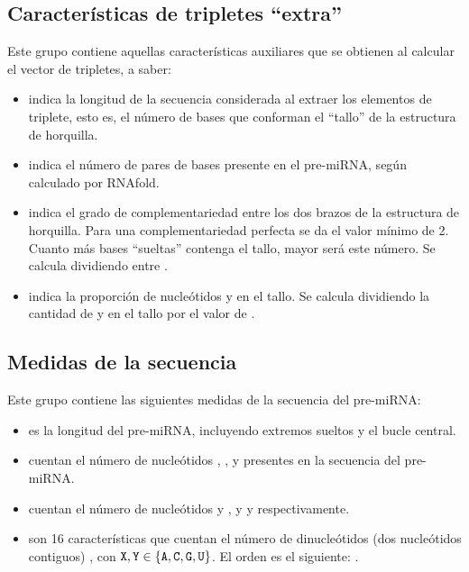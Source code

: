 \documentclass[12pt,bibliography=oldstyle,DIV=12,parskip=half-]{scrartcl}
\begin{document}
\subsection{Características de tripletes ``extra''}
Este grupo contiene aquellas características auxiliares que se obtienen
al calcular el vector de tripletes, a saber:
\begin{itemize}
\item{} indica la longitud de la secuencia considerada al
  extraer los elementos de triplete, esto es, el número de bases que
  conforman el ``tallo'' de la estructura de horquilla.
\item{} indica el número de pares de bases presente en
  el pre-miRNA, según calculado por RNAfold.
\item{} indica el grado de complementariedad
  entre los dos brazos de la estructura de horquilla. Para una
  complementariedad perfecta se da el valor mínimo de 2. Cuanto más
  bases ``sueltas'' contenga el tallo, mayor será este número. Se
  calcula dividiendo  entre .
\item{} indica la proporción de nucleótidos  y
   en el tallo. Se calcula dividiendo la cantidad de 
  y  en el tallo por el valor de .
\end{itemize}
%
\subsection{Medidas de la secuencia}
Este grupo contiene las siguientes medidas de la secuencia del pre-miRNA:
\begin{itemize}
\item{} es la longitud del pre-miRNA, incluyendo extremos sueltos
  y el bucle central.
\item{} cuentan el número de nucleótidos ,
  ,  y  presentes en la secuencia del
  pre-miRNA.
\item{} cuentan el número de nucleótidos  y
  , y  y  respectivamente.
\item{} son 16 características que cuentan el número de
  dinucleótidos (dos nucleótidos contiguos) , con
  ${\tt X,Y}\in\{{\tt A,C,G,U}\}$. El orden es el siguiente:
  .
\end{itemize}
%
\end{document}
